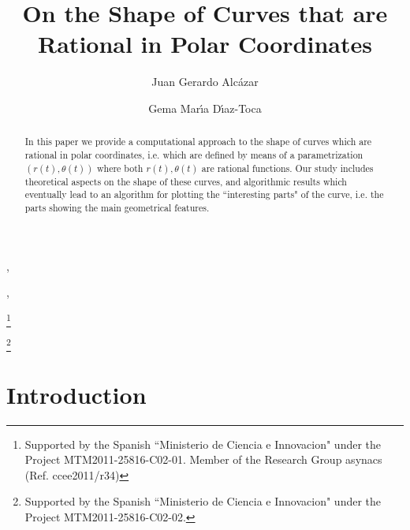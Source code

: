 \documentclass{elsart}
\begin{document}
\begin{frontmatter}






\title{On the Shape of Curves that are Rational in Polar Coordinates}



\author[a]{Juan Gerardo Alc\'azar},
\author[b]{Gema Mar\'{\i}a D\'{\i}az-Toca},




\address[a]{Departamento de Matem\'aticas, Universidad de Alcal\'a,
E-28871 Madrid, Spain}
\address[b]{Departamento de Matem\'atica Aplicada, Universidad de
Murcia,  30100 Murcia, Spain}




\thanks[proy1]{Supported by the Spanish ``Ministerio de
Ciencia e Innovacion" under the Project MTM2011-25816-C02-01. Member of the Research Group {\sc asynacs} (Ref. {\sc ccee2011/r34})}

\thanks[proy2]{Supported by the Spanish ``Ministerio de
Ciencia e Innovacion" under the Project MTM2011-25816-C02-02.}



\begin{abstract}
In this paper we provide a computational approach to the shape
of curves which are rational in polar coordinates, i.e. which are defined by means of a parametrization
$(r(t),\theta(t))$ where both $r(t),\theta(t)$ are rational functions. Our study includes theoretical aspects on the shape of these curves, and algorithmic results which eventually lead to an algorithm for plotting the ``interesting parts" of the curve, i.e. the parts showing the main geometrical features.
\end{abstract}
\end{frontmatter}

\section{Introduction}\label{section-introduction}
\end{document}
